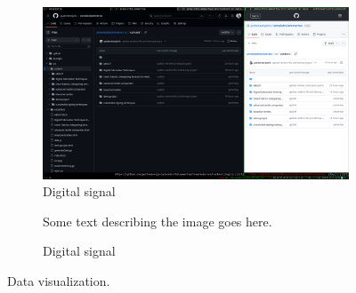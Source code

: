









\begin{figure}[H] 
    \centering
    \begin{subfigure}[b]{0.45\textwidth}
        \centering
        \includegraphics[width=1\textwidth]{sections/assignment_1/1.png}
        \caption{Digital signal}
    \end{subfigure}
    \hfill
    \begin{subfigure}[b]{0.45\textwidth}
        Some text describing the image goes here.

        \caption{Digital signal}
    \end{subfigure}
    \caption{Data visualization.}
    \label{fig:data_vis}
\end{figure}



